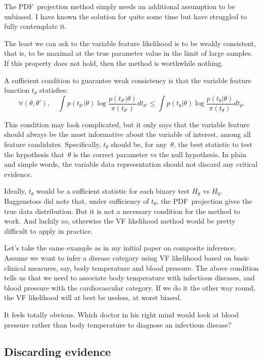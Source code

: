 \documentclass[english]{scrartcl}
\begin{document}
The PDF~projection method simply needs an additional assumption to be unbiased. I have known the solution for quite some time but have struggled to fully contemplate it.

The least we can ask to the variable feature likelihood is to be weakly consistent, that is, to be maximal at the true parameter value in the limit of large samples. If this property does not hold, then the method is worthwhile nothing.

A sufficient condition to guarantee weak consistency is that the variable feature function $t_\theta$ statisfies:
$$
\forall (\theta, \theta'),
\quad
\int p(t_{\theta'}|\theta) \log \frac{p(t_{\theta'}|\theta)}{\pi(t_{\theta'})} dt_{\theta'}
  \leq
\int p(t_{\theta}|\theta) \log \frac{p(t_{\theta}|\theta)}{\pi(t_{\theta})} dt_{\theta}
.
$$

This condition may look complicated, but it only says that the variable feature should always be the most informative about the variable of interest, among all feature candidates. Specifically, $t_\theta$ should be, for any~$\theta$, the best statistic to test the hypothesis that~$\theta$ is the correct parameter vs the null hypothesis. In plain and simple words, the variable data representation should not discard any critical evidence.

Ideally, $t_\theta$ would be a sufficient statistic for each binary test $H_\theta$ vs $H_0$. Baggenstoss did note that, under sufficiency of $t_\theta$, the PDF~projection gives the true data distribution. But it is not a necessary condition for the method to work. And luckily so, otherwise the VF likelihood method would be pretty difficult to apply in practice.

Let's take the same example as in my initial paper on composite inference. Assume we want to infer a disease category using VF likelihood based on basic clinical measures, say, body temperature and blood pressure. The above condition tells us that we need to associate body temperature with infectious diseases, and blood pressure with the cardiovascular category. If we do it the other way round, the VF likelihood will at best be useless, at worst biased.

It feels totally obvious. Which doctor in his right mind would look at blood pressure rather than body temperature to diagnose an infectious disease? 


\subsection{Discarding evidence}
\end{document}
